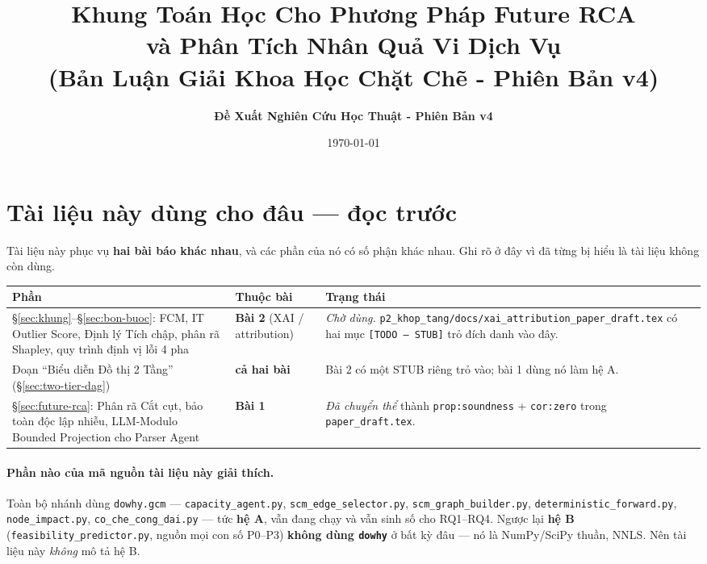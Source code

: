 \documentclass[11pt,a4paper]{article}
\title{\textbf{Khung Toán Học Cho Phương Pháp Future RCA\\ và Phân Tích Nhân Quả Vi Dịch Vụ \\ (Bản Luận Giải Khoa Học Chặt Chẽ - Phiên Bản v4)}}
\author{\textbf{Đề Xuất Nghiên Cứu Học Thuật - Phiên Bản v4}}
\date{\today}
\begin{document}
\maketitle

\tableofcontents
\newpage

\section*{Tài liệu này dùng cho đâu --- đọc trước}

Tài liệu này phục vụ \textbf{hai bài báo khác nhau}, và các phần của nó có số phận
khác nhau. Ghi rõ ở đây vì đã từng bị hiểu là tài liệu không còn dùng.

\begin{center}
\begin{tabular}{p{5.6cm}p{3.0cm}p{5.2cm}}
\toprule
\textbf{Phần} & \textbf{Thuộc bài} & \textbf{Trạng thái} \\
\midrule
\S\ref{sec:khung}--\S\ref{sec:bon-buoc}: FCM, IT Outlier Score, Định lý Tích chập,
phân rã Shapley, quy trình định vị lỗi 4 pha
& \textbf{Bài 2} (XAI / attribution)
& \emph{Chờ dùng.} \texttt{p2\_khop\_tang/docs/xai\_attribution\_paper\_draft.tex}
có hai mục \texttt{[TODO --- STUB]} trỏ đích danh vào đây. \\
\addlinespace
Đoạn ``Biểu diễn Đồ thị 2 Tầng'' (\S\ref{sec:two-tier-dag})
& \textbf{cả hai bài}
& Bài 2 có một STUB riêng trỏ vào; bài 1 dùng nó làm hệ A. \\
\addlinespace
\S\ref{sec:future-rca}: Phân rã Cắt cụt, bảo toàn độc lập nhiễu,
LLM-Modulo Bounded Projection cho Parser Agent
& \textbf{Bài 1}
& \emph{Đã chuyển thể} thành \texttt{prop:soundness} + \texttt{cor:zero}
trong \texttt{paper\_draft.tex}. \\
\bottomrule
\end{tabular}
\end{center}

\paragraph{Phần nào của mã nguồn tài liệu này giải thích.} Toàn bộ nhánh dùng
\texttt{dowhy.gcm} --- \texttt{capacity\_agent.py}, \texttt{scm\_edge\_selector.py},
\texttt{scm\_graph\_builder.py}, \texttt{deterministic\_forward.py},
\texttt{node\_impact.py}, \texttt{co\_che\_cong\_dai.py} --- tức \textbf{hệ A}, vẫn đang
chạy và vẫn sinh số cho RQ1--RQ4. Ngược lại \textbf{hệ B}
(\texttt{feasibility\_predictor.py}, nguồn mọi con số P0--P3) \textbf{không dùng
\texttt{dowhy}} ở bất kỳ đâu --- nó là NumPy/SciPy thuần, NNLS. Nên tài liệu này
\emph{không} mô tả hệ B.
\end{document}
